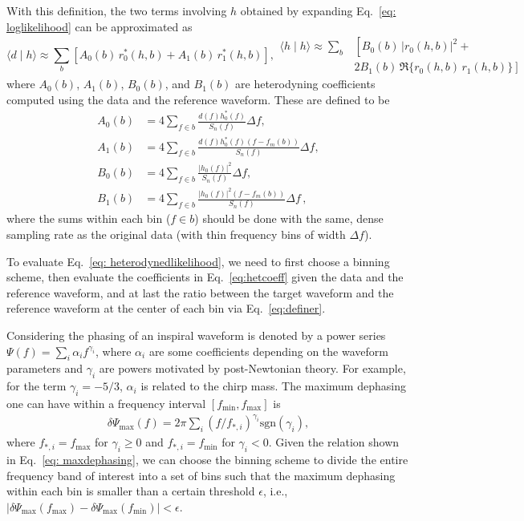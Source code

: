 \documentclass[twocolumn]{aastex631}
\begin{document}
With this definition, the two terms involving $h$ obtained by expanding
Eq.~\eqref{eq: loglikelihood} can be approximated as
\begin{subequations} \label{eq: heterodynedlikelihood}
\begin{equation}
    \langle d \mid h \rangle \approx \sum_b \left[ A_0(b)\, r^*_0(h,b) + A_1(b)\, r^*_1(h,b) \right] ,
\end{equation}
\begin{align}
    \langle h \mid h \rangle \approx \sum_b &\left[ B_0(b)\, |r_0(h,b)|^2 + \right. \nonumber \\
    &\left. 2 B_1(b)\, \Re\{r_0(h,b)\, r_1(h,b)\} \right] 
\end{align}
\end{subequations} 
where $A_0(b)$, $A_1(b)$, $B_0(b)$, and $B_1(b)$ are heterodyning coefficients
computed using the data and the reference waveform. These are defined to be
\begin{subequations} \label{eq:hetcoeff}
\begin{align}
    A_0(b) &= 4 \sum_{f \in b} \frac{d(f)h^*_0(f)}{S_n(f)} \Delta f, \\
    A_1(b) &= 4 \sum_{f \in b} \frac{d(f)h^*_0(f)(f-f_m(b))}{S_n(f)} \Delta f, \\
    B_0(b) &= 4 \sum_{f \in b} \frac{|h_0(f)|^2}{S_n(f)} \Delta f, \\
    B_1(b) &= 4 \sum_{f \in b} \frac{|h_0(f)|^2(f-f_m(b))}{S_n(f)} \Delta f\, ,
\end{align}
\end{subequations}
where the sums within each bin ($f \in b$) should be done with the same, dense
sampling rate as the original data (with thin frequency bins of width $\Delta f$).

To evaluate Eq.~\eqref{eq: heterodynedlikelihood}, we need to first choose a
binning scheme, then evaluate the coefficients in Eq.~\eqref{eq:hetcoeff} given
the data and the reference waveform, and at last the ratio between the target
waveform and the reference waveform at the center of each bin via
Eq.~\eqref{eq:definer}.

Considering the phasing of an inspiral waveform is denoted by a power series
$\Psi(f) = \sum_i \alpha_i f^{\gamma_i}$, where $\alpha_i$ are some
coefficients depending on the waveform parameters and $\gamma_i$ are powers
motivated by post-Newtonian theory. For example, for the term $\gamma_i =
-5/3$, $\alpha_i$ is related to the chirp mass. The maximum dephasing one can
have within a frequency interval $[f_{\textrm{min}},f_{\textrm{max}}]$ is 
\begin{align}
    \delta \Psi_{\textrm{max}}(f) = 2\pi \sum_{i} (f/f_{*,i})^{\gamma_i} \textrm{sgn}(\gamma_i),
\label{eq: maxdephasing}
\end{align}
where $f_{*,i} = f_{\textrm{max}}$ for $\gamma_i \geq 0$ and $f_{*,i} =
f_{\textrm{min}}$ for $\gamma_i<0$. Given the relation shown in Eq.~\eqref{eq:
maxdephasing}, we can choose the binning scheme to divide the entire frequency
band of interest into a set of bins such that the maximum dephasing within each
bin is smaller than a certain threshold $\epsilon$, i.e.,
$|\delta\Psi_{\textrm{max}}(f_{\textrm{max}}) -
\delta\Psi_{\textrm{max}}(f_{\textrm{min}})| < \epsilon$. 
\end{document}
